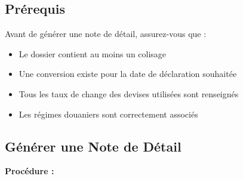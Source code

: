\documentclass[12pt,a4paper]{report}
\begin{document}
\subsection{Prérequis}

Avant de générer une note de détail, assurez-vous que :

\begin{itemize}[leftmargin=*]
    \item Le dossier contient au moins un colisage
    \item Une conversion existe pour la date de déclaration souhaitée
    \item Tous les taux de change des devises utilisées sont renseignés
    \item Les régimes douaniers sont correctement associés
\end{itemize}

\subsection{Générer une Note de Détail}

\textbf{Procédure :}
\end{document}
